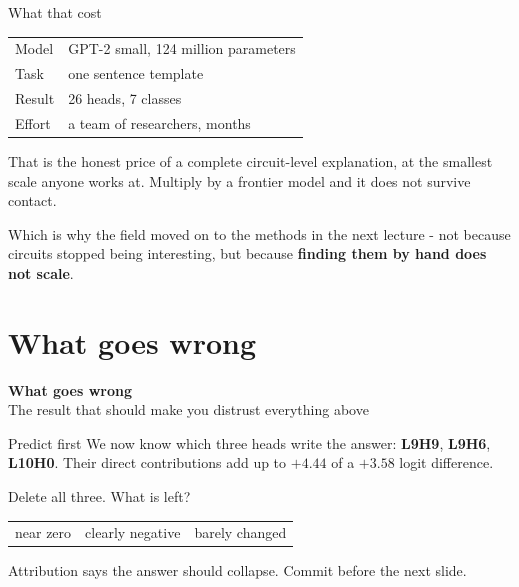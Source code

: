 \documentclass[aspectratio=169]{beamer}
\newcommand{\trapbox}[1]{%
  \begin{tcolorbox}[colback=armred!8, colframe=armred, boxrule=0.6pt, arc=2pt]
  #1
  \end{tcolorbox}}
\newcommand{\takebox}[1]{%
  \begin{tcolorbox}[colback=paramgreen!8, colframe=paramgreen, boxrule=0.6pt, arc=2pt]
  #1
  \end{tcolorbox}}
\newcommand{\sectiontransition}[2]{%
  \begin{frame}[plain]
    \vfill
    \begin{center}
      {\Huge\bfseries\color{popblue} #1}\\[1.1em]
      {\large #2}
    \end{center}
    \vfill
  \end{frame}}
\begin{document}
\begin{frame}{What that cost}
  \vspace{1.0em}
  \begin{center}
  \small
  \begin{tabular}{@{}ll@{}}
    \toprule
    Model & GPT-2 small, 124 million parameters\\
    Task & one sentence template\\
    Result & 26 heads, 7 classes\\
    Effort & a team of researchers, months\\
    \bottomrule
  \end{tabular}
  \end{center}

  \vspace{0.8em}
  \trapbox{\small That is the honest price of a complete circuit-level explanation, at the
  smallest scale anyone works at. Multiply by a frontier model and it does not survive contact.}

  \vspace{0.5em}
  \takebox{\small Which is why the field moved on to the methods in the next lecture - not
  because circuits stopped being interesting, but because \textbf{finding them by hand does not
  scale}.}
\end{frame}

\section{What goes wrong}
\sectiontransition{What goes wrong}{The result that should make you distrust everything above}

\begin{frame}{Predict first}
  \vspace{0.9em}
  We now know which three heads write the answer: \textbf{L9H9}, \textbf{L9H6}, \textbf{L10H0}.
  Their direct contributions add up to $+4.44$ of a $+3.58$ logit difference.

  \vspace{1.2em}
  \begin{center}
    {\large Delete all three. What is left?}
  \end{center}

  \vspace{1.2em}
  \begin{center}
  \small
  \begin{tabular}{@{}ccc@{}}
    near zero & clearly negative & barely changed\\
  \end{tabular}
  \end{center}

  \vspace{1.0em}
  \begin{center}
    {\footnotesize Attribution says the answer should collapse. Commit before the next slide.}
  \end{center}
\end{frame}
\end{document}
